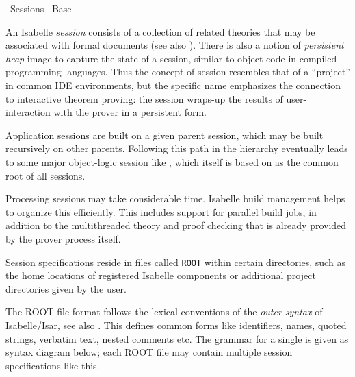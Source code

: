 %
\begin{isabellebody}%
\def\isabellecontext{Sessions}%
%
\isadelimtheory
%
\endisadelimtheory
%
\isatagtheory
{}\isamarkupfalse%
\ Sessions\isanewline
{}\ Base\isanewline
{}%
\endisatagtheory
{\isafoldtheory}%
%
\isadelimtheory
%
\endisadelimtheory
%
\isamarkuptrue%
%
\begin{isamarkuptext}%
An Isabelle \emph{session} consists of a collection of related
  theories that may be associated with formal documents (see also
  ).  There is also a notion of \emph{persistent
  heap} image to capture the state of a session, similar to
  object-code in compiled programming languages.  Thus the concept of
  session resembles that of a ``project'' in common IDE environments,
  but the specific name emphasizes the connection to interactive
  theorem proving: the session wraps-up the results of
  user-interaction with the prover in a persistent form.

  Application sessions are built on a given parent session, which may
  be built recursively on other parents.  Following this path in the
  hierarchy eventually leads to some major object-logic session like
  , which itself is based on  as the common
  root of all sessions.

  Processing sessions may take considerable time.  Isabelle build
  management helps to organize this efficiently.  This includes
  support for parallel build jobs, in addition to the multithreaded
  theory and proof checking that is already provided by the prover
  process itself.%
\end{isamarkuptext}%
\isamarkuptrue%
%
\isamarkuptrue%
%
\begin{isamarkuptext}%
Session specifications reside in files called \verb|ROOT|
  within certain directories, such as the home locations of registered
  Isabelle components or additional project directories given by the
  user.

  The ROOT file format follows the lexical conventions of the
  \emph{outer syntax} of Isabelle/Isar, see also
  \cite{isabelle-isar-ref}.  This defines common forms like
  identifiers, names, quoted strings, verbatim text, nested comments
  etc.  The grammar for a single \hyperlink{syntax.session-entry}{\mbox{}} is given as
  syntax diagram below; each ROOT file may contain multiple session
  specifications like this.


\end{isamarkuptext}
\end{isabellebody}
